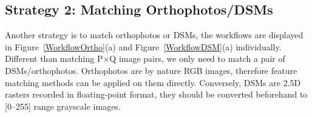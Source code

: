 
\subsection{Strategy 2: Matching Orthophotos/DSMs}
Another strategy is to match orthophotos or DSMs, the workflows are displayed in Figure~\ref{WorkflowOrtho}(a) and Figure~\ref{WorkflowDSM}(a) individually. Different than matching P$\times$Q image pairs, we only need to match a pair of DSMs/orthophotos.
Orthophotos are by nature RGB images, therefore feature matching methods can be applied on them directly. Conversely, DSMs are 2.5D rasters recorded in floating-point format, they should be converted beforehand to [0–255] range grayscale images.
\par
